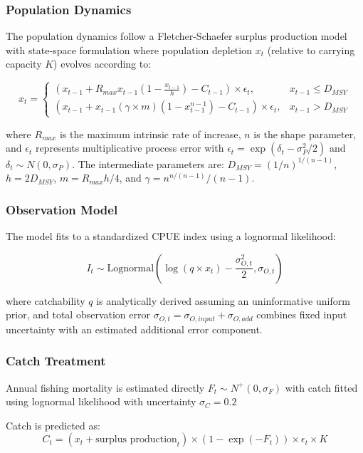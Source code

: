 \documentclass[
  11pt,
]{SCreport}
\begin{document}
\subsubsection{Population Dynamics}\label{sec-population-dynamics}

The population dynamics follow a Fletcher-Schaefer surplus production
model with state-space formulation where population depletion \(x_t\)
(relative to carrying capacity \(K\)) evolves according to:

\[x_t = \begin{cases} 
(x_{t-1} + R_{max} x_{t-1} (1 - \frac{x_{t-1}}{h}) - C_{t-1}) \times \epsilon_t, & x_{t-1} \leq D_{MSY} \\
(x_{t-1} + x_{t-1}(\gamma \times m)(1 - x_{t-1}^{n-1}) - C_{t-1}) \times \epsilon_t, & x_{t-1} > D_{MSY}
\end{cases}\]

where \(R_{max}\) is the maximum intrinsic rate of increase, \(n\) is
the shape parameter, and \(\epsilon_t\) represents multiplicative
process error with \(\epsilon_t = \exp(\delta_t - \sigma_P^2/2)\) and
\(\delta_t \sim N(0, \sigma_P)\). The intermediate parameters are:
\(D_{MSY} = (1/n)^{1/(n-1)}\), \(h = 2D_{MSY}\), \(m = R_{max}h/4\), and
\(\gamma = n^{n/(n-1)}/(n-1)\).

\subsubsection{Observation Model}\label{sec-observation-model}

The model fits to a standardized CPUE index using a lognormal
likelihood:

\[I_t \sim \text{Lognormal}(\log(q \times x_t) - \frac{\sigma_{O,t}^2}{2}, \sigma_{O,t})\]

where catchability \(q\) is analytically derived assuming an
uninformative uniform prior, and total observation error
\(\sigma_{O,t} = \sigma_{O,input} + \sigma_{O,add}\) combines fixed
input uncertainty with an estimated additional error component.

\subsubsection{Catch Treatment}\label{sec-catch-treatment}

Annual fishing mortality is estimated directly
\(F_t \sim N^+(0, \sigma_F)\) with catch fitted using lognormal
likelihood with uncertainty \(\sigma_C = 0.2\)

Catch is predicted as:
\[C_t = (x_t + \text{surplus production}_t) \times (1 - \exp(-F_t)) \times \epsilon_t \times K\]
\end{document}
